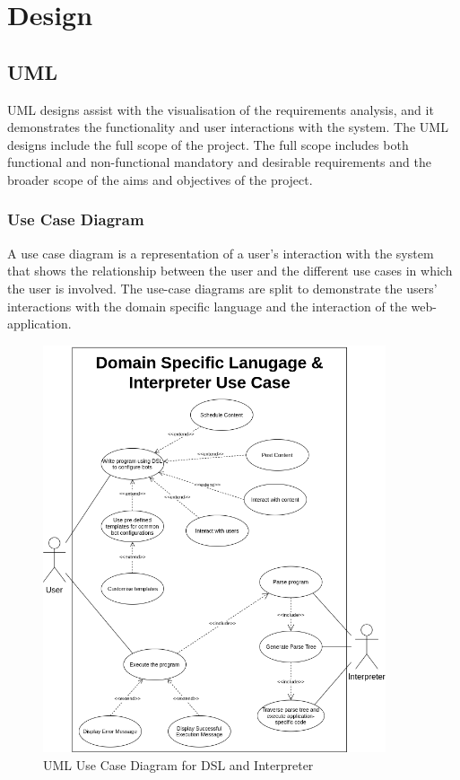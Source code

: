 \setlength{\grammarparsep}{2pt plus 1pt minus 1pt} %
\setlength{\grammarindent}{12em} %
\chapter{Design}
\section{UML}
UML designs assist with the visualisation of the requirements analysis, and it demonstrates the functionality and user interactions with the system. The UML designs include the full scope of the project. The full scope includes both functional and non-functional mandatory and desirable requirements and the broader scope of the aims and objectives of the project.

\subsection{Use Case Diagram}

A use case diagram is a representation of a user's interaction with the system that shows the relationship between the user and the different use cases in which the user is involved. The use-case diagrams are split to demonstrate the users' interactions with the domain specific language and the interaction of the web-application.
\begin{figure}
  \centering
  \includegraphics[width=0.9\textwidth]{images/usecasedsl.png}
  \caption{UML Use Case Diagram for DSL and Interpreter}
\end{figure}

